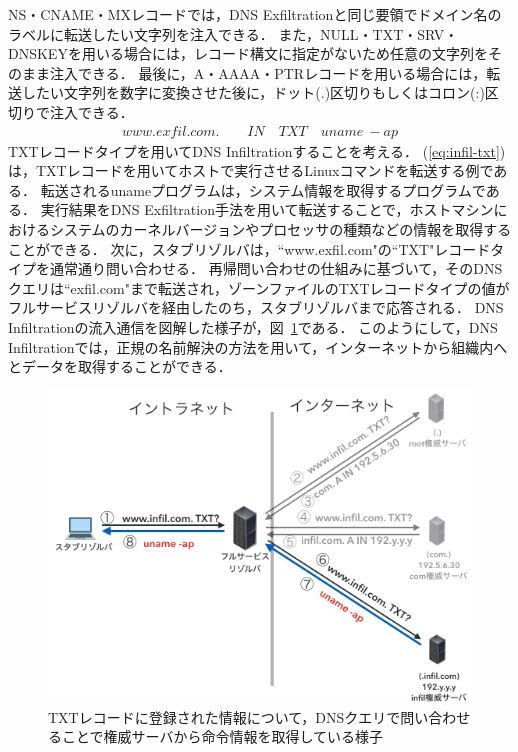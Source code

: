 NS・CNAME・MXレコードでは，DNS Exfiltrationと同じ要領でドメイン名のラベルに転送したい文字列を注入できる．
また，NULL・TXT・SRV・DNSKEYを用いる場合には，レコード構文に指定がないため任意の文字列をそのまま注入できる．
最後に，A・AAAA・PTRレコードを用いる場合には，転送したい文字列を数字に変換させた後に，ドット(.)区切りもしくはコロン(:)区切りで注入できる．
\begin{eqnarray}
 www.exfil.com. \qquad IN \quad TXT \quad uname \ -ap
 \label{eq:infil-txt}
\end{eqnarray}
TXTレコードタイプを用いてDNS Infiltrationすることを考える．
(\ref{eq:infil-txt})は，TXTレコードを用いてホストで実行させるLinuxコマンドを転送する例である．
転送されるunameプログラムは，システム情報を取得するプログラムである．
実行結果をDNS Exfiltration手法を用いて転送することで，ホストマシンにおけるシステムのカーネルバージョンやプロセッサの種類などの情報を取得することができる．
次に，スタブリゾルバは，``www.exfil.com"の``TXT"レコードタイプを通常通り問い合わせる．
再帰問い合わせの仕組みに基づいて，そのDNSクエリは``exfil.com"まで転送され，ゾーンファイルのTXTレコードタイプの値がフルサービスリゾルバを経由したのち，スタブリゾルバまで応答される．
DNS Infiltrationの流入通信を図解した様子が，図~\ref{fig:dns-infiltration}である．
このようにして，DNS Infiltrationでは，正規の名前解決の方法を用いて，インターネットから組織内へとデータを取得することができる．
\begin{figure}[htbp]
 \centering
 \includegraphics[scale=0.3]{figure/dns-infiltration.png}
 \caption[DNS Infiltrationの概略図]{TXTレコードに登録された情報について，DNSクエリで問い合わせることで権威サーバから命令情報を取得している様子}
 \label{fig:dns-infiltration}
\end{figure}


